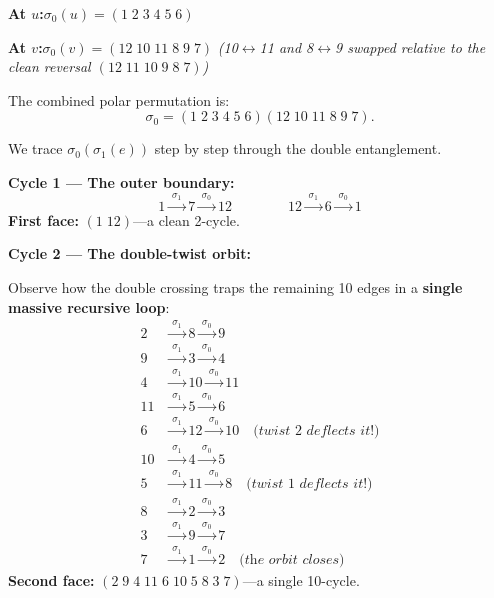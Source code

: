 \medskip
\noindent
\textbf{At $u$:}\quad $\sigma_0(u) = (1\;2\;3\;4\;5\;6)$

\noindent
\textbf{At $v$:}\quad $\sigma_0(v) = (12\;10\;11\;8\;9\;7)$
\quad\textit{(10$\leftrightarrow$11 and 8$\leftrightarrow$9 swapped
relative to the clean reversal $(12\;11\;10\;9\;8\;7)$)}

\medskip
\noindent
The combined polar permutation is:
\[
  \sigma_0 = (1\;2\;3\;4\;5\;6)(12\;10\;11\;8\;9\;7).
\]

\medskip
\noindent
We trace $\sigma_0(\sigma_1(e))$ step by step through the double
entanglement.

\medskip
\noindent
\textbf{Cycle 1 --- The outer boundary:}
\[
  1 \xrightarrow{\;\sigma_1\;} 7 \xrightarrow{\;\sigma_0\;} 12
  \qquad\qquad
  12 \xrightarrow{\;\sigma_1\;} 6 \xrightarrow{\;\sigma_0\;} 1
\]
\textbf{First face:} $(1\;12)$---a clean 2-cycle.

\medskip
\noindent
\textbf{Cycle 2 --- The double-twist orbit:}

Observe how the double crossing traps the remaining 10 edges in a
\textbf{single massive recursive loop}:
\begin{align*}
  2 &\xrightarrow{\;\sigma_1\;} 8  \xrightarrow{\;\sigma_0\;} 9 \\
  9 &\xrightarrow{\;\sigma_1\;} 3  \xrightarrow{\;\sigma_0\;} 4 \\
  4 &\xrightarrow{\;\sigma_1\;} 10 \xrightarrow{\;\sigma_0\;} 11 \\
  11 &\xrightarrow{\;\sigma_1\;} 5  \xrightarrow{\;\sigma_0\;} 6 \\
  6 &\xrightarrow{\;\sigma_1\;} 12 \xrightarrow{\;\sigma_0\;} 10
    \quad\textit{(twist~2 deflects it!)} \\
  10 &\xrightarrow{\;\sigma_1\;} 4  \xrightarrow{\;\sigma_0\;} 5 \\
  5 &\xrightarrow{\;\sigma_1\;} 11 \xrightarrow{\;\sigma_0\;} 8
    \quad\textit{(twist~1 deflects it!)} \\
  8 &\xrightarrow{\;\sigma_1\;} 2  \xrightarrow{\;\sigma_0\;} 3 \\
  3 &\xrightarrow{\;\sigma_1\;} 9  \xrightarrow{\;\sigma_0\;} 7 \\
  7 &\xrightarrow{\;\sigma_1\;} 1  \xrightarrow{\;\sigma_0\;} 2
    \quad\textit{(the orbit closes)}
\end{align*}
\textbf{Second face:}
$(2\;9\;4\;11\;6\;10\;5\;8\;3\;7)$---a single 10-cycle.

